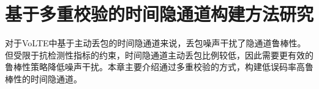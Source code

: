 \chapter{基于多重校验的时间隐通道构建方法研究}
\label{chap:hash}

对于VoLTE中基于主动丢包的时间隐通道来说，丢包噪声干扰了隐通道鲁棒性。但受限于抗检测性指标的约束，时间隐通道主动丢包比例较低，因此需要更有效的鲁棒性策略降低噪声干扰。本章主要介绍通过多重校验的方式，构建低误码率高鲁棒性的时间隐通道。






